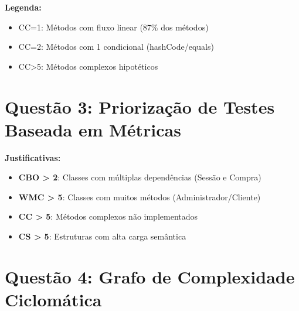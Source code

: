 \documentclass{article}
\begin{document}
\textbf{Legenda:}
\begin{itemize}
\item CC=1: Métodos com fluxo linear (87\% dos métodos)
\item CC=2: Métodos com 1 condicional (hashCode/equals)
\item CC>5: Métodos complexos hipotéticos
\end{itemize}

\section*{Questão 3: Priorização de Testes Baseada em Métricas}

\begin{table}[ht]
\centering
\caption{Elementos Prioritários para Testes}
\end{table}

\textbf{Justificativas:}
\begin{itemize}
\item \textbf{CBO > 2}: Classes com múltiplas dependências (Sessão e Compra)
\item \textbf{WMC > 5}: Classes com muitos métodos (Administrador/Cliente)
\item \textbf{CC > 5}: Métodos complexos não implementados
\item \textbf{CS > 5}: Estruturas com alta carga semântica
\end{itemize}

\section*{Questão 4: Grafo de Complexidade Ciclomática}
\end{document}
